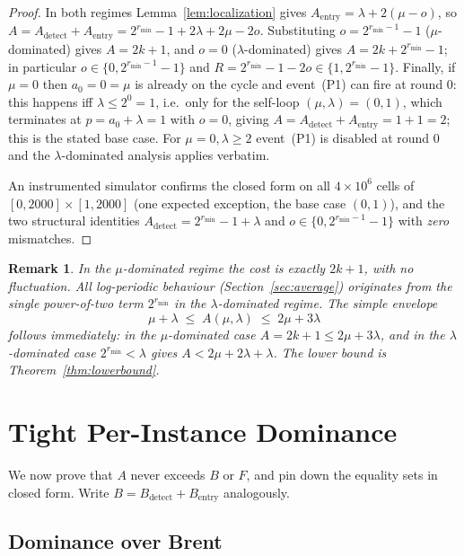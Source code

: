 \documentclass[11pt]{article}
\newtheorem{remark}[theorem]{Remark}
\begin{document}
\begin{proof}
In both regimes Lemma~\ref{lem:localization} gives
$A_{\mathrm{entry}}=\lambda+2(\mu-o)$, so
$A=A_{\mathrm{detect}}+A_{\mathrm{entry}}=2^{r_{\min}}-1+2\lambda+2\mu-2o$.
Substituting $o=2^{r_{\min}-1}-1$ ($\mu$-dominated) gives $A=2k+1$, and $o=0$
($\lambda$-dominated) gives $A=2k+2^{r_{\min}}-1$; in particular
$o\in\{0,2^{r_{\min}-1}-1\}$ and $R=2^{r_{\min}}-1-2o\in\{1,2^{r_{\min}}-1\}$.
Finally, if $\mu=0$ then $a_0=0=\mu$ is already on the cycle and event~(P1) can
fire at round $0$: this happens iff $\lambda\le 2^{0}=1$, i.e.\ only for the
self-loop $(\mu,\lambda)=(0,1)$, which terminates at $p=a_0+\lambda=1$ with
$o=0$, giving $A=A_{\mathrm{detect}}+A_{\mathrm{entry}}=1+1=2$; this is the stated
base case. For $\mu=0,\lambda\ge2$ event~(P1) is disabled at round $0$ and the
$\lambda$-dominated analysis applies verbatim.

An instrumented simulator confirms the closed form on all $4\times10^6$ cells of
$[0,2000]\times[1,2000]$ (one expected exception, the base case $(0,1)$), and the
two structural identities $A_{\mathrm{detect}}=2^{r_{\min}}-1+\lambda$ and
$o\in\{0,2^{r_{\min}-1}-1\}$ with \emph{zero} mismatches.
\end{proof}

\begin{remark}
In the $\mu$-dominated regime the cost is \emph{exactly} $2k+1$, with no
fluctuation. All log-periodic behaviour (Section~\ref{sec:average}) originates
from the single power-of-two term $2^{r_{\min}}$ in the $\lambda$-dominated
regime. The simple envelope
\[
\mu+\lambda\;\le\;A(\mu,\lambda)\;\le\;2\mu+3\lambda
\]
follows immediately: in the $\mu$-dominated case $A=2k+1\le 2\mu+3\lambda$, and in
the $\lambda$-dominated case $2^{r_{\min}}<\lambda$ gives
$A<2\mu+2\lambda+\lambda$. The lower bound is Theorem~\ref{thm:lowerbound}.
\end{remark}

\section{Tight Per-Instance Dominance}
\label{sec:dominance}

We now prove that $A$ never exceeds $B$ or $F$, and pin down the equality sets in
closed form. Write $B=B_{\mathrm{detect}}+B_{\mathrm{entry}}$ analogously.

\subsection{Dominance over Brent}
\end{document}
